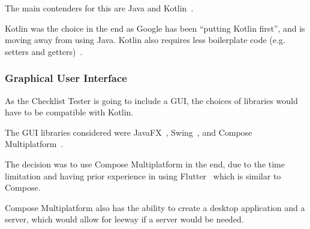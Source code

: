 \documentclass[../dissertation.tex]{subfiles}
\begin{document}
The main contenders for this are Java and Kotlin~\cite{kotlin}.

Kotlin was the choice in the end as Google has been \enquote{putting Kotlin first},
and is moving away from using Java. Kotlin also requires less boilerplate code (e.g. setters and getters)~\cite{android-kotlin}.

\subsubsection{Graphical User Interface}

As the Checklist Tester is going to include a GUI, the choices of libraries would have to
be compatible with Kotlin.

The GUI libraries considered were JavaFX~\cite{javafx}, Swing~\cite{flatlaf}, and Compose Multiplatform~\cite{compose}.

The decision was to use Compose Multiplatform in the end, due to the time limitation and
having prior experience in using Flutter~\cite{flutter} which is similar to Compose.

Compose Multiplatform also has the ability to create a desktop application and a server,
which would allow for leeway if a server would be needed.
\end{document}
